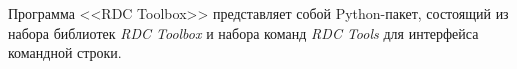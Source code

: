 \newpage\annotation
{}


%



Программа <<RDC Toolbox>> представляет собой Python-пакет, состоящий из набора библиотек \textit{RDC Toolbox} и набора команд \textit{RDC Tools} для интерфейса командной строки.\\

